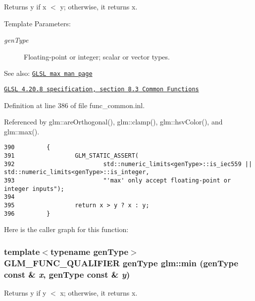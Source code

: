 Returns y if x $<$ y; otherwise, it returns x.

\begin{Desc}
\item[Template Parameters:]
\begin{description}
\item[{\em genType}]Floating-point or integer; scalar or vector types.\end{description}
\end{Desc}
\begin{Desc}
\item[See also:]\href{http://www.opengl.org/sdk/docs/manglsl/xhtml/max.xml}{\tt GLSL max man page} 

\href{http://www.opengl.org/registry/doc/GLSLangSpec.4.20.8.pdf}{\tt GLSL 4.20.8 specification, section 8.3 Common Functions} \end{Desc}


Definition at line 386 of file func\_\-common.inl.

Referenced by glm::areOrthogonal(), glm::clamp(), glm::hsvColor(), and glm::max().

\begin{Code}\begin{verbatim}390         {
391                 GLM_STATIC_ASSERT(
392                         std::numeric_limits<genType>::is_iec559 || std::numeric_limits<genType>::is_integer,
393                         "'max' only accept floating-point or integer inputs");
394 
395                 return x > y ? x : y;
396         }
\end{verbatim}
\end{Code}




Here is the caller graph for this function:\hypertarget{group__core__func__common_g7c4425eacc9498bb2ab8a7cfd662cd69}{
\subsubsection[min]{\setlength{\rightskip}{0pt plus 5cm}template$<$typename genType$>$ GLM\_\-FUNC\_\-QUALIFIER genType glm::min (genType const \& {\em x}, \/  genType const \& {\em y})}}
\label{group__core__func__common_g7c4425eacc9498bb2ab8a7cfd662cd69}


Returns y if y $<$ x; otherwise, it returns x.

